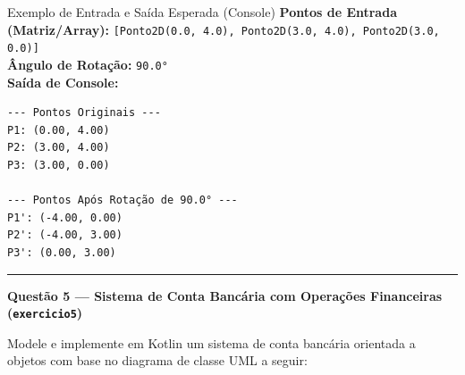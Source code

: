 \documentclass[12pt]{article}
\begin{document}
\vspace{0.2cm}
\begin{center}
\end{center}

\vspace{0.2cm}
\begin{block}{Exemplo de Entrada e Saída Esperada (Console)}
\textbf{Pontos de Entrada (Matriz/Array):} \texttt{[Ponto2D(0.0, 4.0), Ponto2D(3.0, 4.0), Ponto2D(3.0, 0.0)]}\\
\textbf{Ângulo de Rotação:} \texttt{90.0°}\\
\textbf{Saída de Console:}
\begin{verbatim}
--- Pontos Originais ---
P1: (0.00, 4.00)
P2: (3.00, 4.00)
P3: (3.00, 0.00)

--- Pontos Após Rotação de 90.0° ---
P1': (-4.00, 0.00)
P2': (-4.00, 3.00)
P3': (0.00, 3.00)
\end{verbatim}
\end{block}

\vspace{0.6cm}
\noindent\rule{\textwidth}{0.8pt}
\vspace{0.4cm}

\noindent\textbf{Questão 5 — Sistema de Conta Bancária com Operações Financeiras (\texttt{exercicio5})}

\vspace{0.2cm}
\noindent
Modele e implemente em Kotlin um sistema de conta bancária orientada a objetos com base no diagrama de classe UML a seguir:
\end{document}

